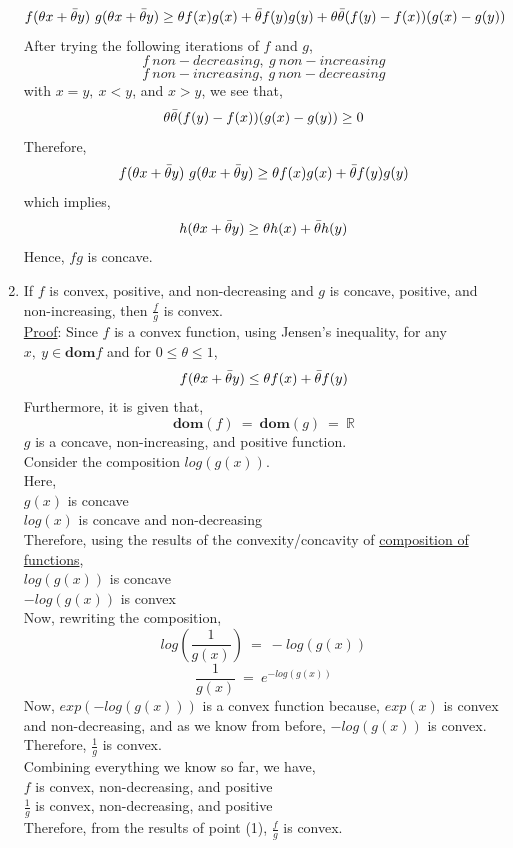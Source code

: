 \documentclass[12pt, draftcls, onecolumn]{IEEEtran}
\begin{document}
\begin{enumerate}
\begin{equation*}
    \end{equation*}
    \begin{equation*}
        \begin{aligned}
            f(\theta x+\Bar{\theta} y)\ g(\theta x+\Bar{\theta} y) \geq \theta f(x)g(x) + \Bar{\theta} f(y)g(y) + \theta \Bar{\theta} (f(y)-f(x))(g(x)-g(y))
        \end{aligned}
    \end{equation*}
    After trying the following iterations of $f$ and $g$,
    \[f\ non-decreasing,\ g\ non-increasing\]
    \[f\ non-increasing,\ g\ non-decreasing\]
    with $x=y,\ x < y$, and $x > y$, we see that,
    \[\theta \Bar{\theta} (f(y)-f(x))(g(x)-g(y)) \geq 0\]
    Therefore,
    \begin{equation}\label{9}
            f(\theta x+\Bar{\theta} y)\ g(\theta x+\Bar{\theta} y) \geq \theta f(x)g(x) + \Bar{\theta} f(y)g(y)
    \end{equation}
    which implies,
    \begin{equation}\label{10}
            h(\theta x+\Bar{\theta} y) \geq \theta h(x) + \Bar{\theta} h(y)
    \end{equation}
    Hence, $fg$ is concave.
    \item If $f$ is convex, positive, and non-decreasing and $g$ is concave, positive, and non-increasing, then $\frac{f}{g}$ is convex.
    \\\underline{Proof}: Since $f$ is a convex function, using Jensen's inequality, for any $x,\ y \in \textbf{dom}f$ and for $0 \leq \theta \leq 1$,
    \[f(\theta x + \Bar{\theta} y) \leq \theta f(x) + \Bar{\theta} f(y)\]
    Furthermore, it is given that,
    \[\textbf{dom}(f)\ =\ \textbf{dom}(g)\ =\ \mathbb{R}\]
    $g$ is a concave, non-increasing, and positive function.
    \\Consider the composition $log(g(x))$.
    \\Here,
    \\$g(x)$ is concave
    \\$log(x)$ is concave and non-decreasing
    \\Therefore, using the results of the convexity/concavity of \underline{composition of functions},
    \\$log(g(x))$ is concave
    \\$-log(g(x))$ is convex
    \\Now, rewriting the composition,
    \[log(\frac{1}{g(x)})\ =\ -log(g(x))\]
    \[\frac{1}{g(x)}\ =\ e^{-log(g(x))}\]
    Now, $exp(-log(g(x)))$ is a convex function because,
    $exp(x)$ is convex and non-decreasing, and as we know from before,
    $-log(g(x))$ is convex.
    \\Therefore, $\frac{1}{g}$ is convex.
    \\Combining everything we know so far, we have,
    \\$f$ is convex, non-decreasing, and positive
    \\$\frac{1}{g}$ is convex, non-decreasing, and positive
    \\Therefore, from the results of point (1), $\frac{f}{g}$ is convex.
\end{enumerate}
\end{document}
